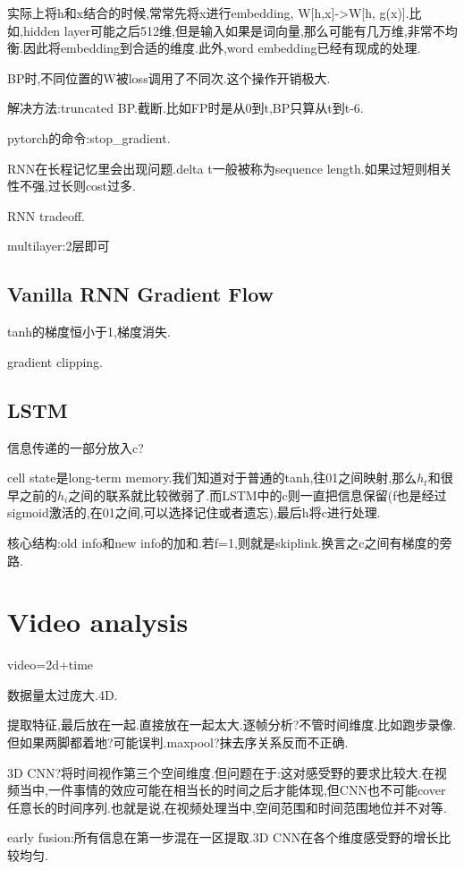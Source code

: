 	实际上将h和x结合的时候,常常先将x进行embedding, W[h,x]->W[h, g(x)].比如,hidden layer可能之后512维,但是输入如果是词向量,那么可能有几万维,非常不均衡.因此将embedding到合适的维度.此外,word embedding已经有现成的处理.
	
	BP时,不同位置的W被loss调用了不同次.这个操作开销极大.
	
	解决方法:truncated BP.截断.比如FP时是从0到t,BP只算从t到t-6.
	
	pytorch的命令:stop\_gradient.

	RNN在长程记忆里会出现问题.delta t一般被称为sequence length.如果过短则相关性不强,过长则cost过多.
	
	RNN tradeoff.
	
	multilayer:2层即可
	
	\subsection{Vanilla RNN Gradient Flow}
	
	tanh的梯度恒小于1,梯度消失.
	
	gradient clipping.
	
	\subsection{LSTM}
	信息传递的一部分放入c?
	
	cell state是long-term memory.我们知道对于普通的tanh,往01之间映射,那么$h_t$和很早之前的$h_i$之间的联系就比较微弱了.而LSTM中的c则一直把信息保留(f也是经过sigmoid激活的,在01之间,可以选择记住或者遗忘),最后h将c进行处理.
	
	核心结构:old info和new info的加和.若f=1,则就是skiplink.换言之c之间有梯度的旁路.
	
	\clearpage
	\section{Video analysis}
	video=2d+time
	
	数据量太过庞大.4D.
	
	提取特征,最后放在一起.直接放在一起太大.逐帧分析?不管时间维度.比如跑步录像.但如果两脚都着地?可能误判.maxpool?抹去序关系反而不正确.
	
	3D CNN?将时间视作第三个空间维度.但问题在于:这对感受野的要求比较大.在视频当中,一件事情的效应可能在相当长的时间之后才能体现,但CNN也不可能cover任意长的时间序列.也就是说,在视频处理当中,空间范围和时间范围地位并不对等.
	
	early fusion:所有信息在第一步混在一区提取.3D CNN在各个维度感受野的增长比较均匀.
	
